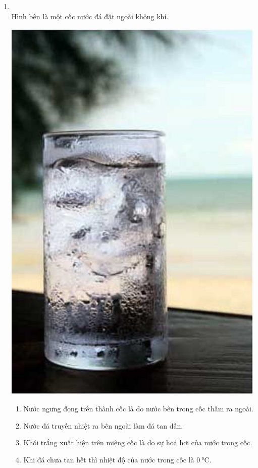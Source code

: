 \begin{enumerate}[label=\bfseries Câu \arabic*:, leftmargin=1.7cm]
	\item {}\\
	Hình bên là một cốc nước đá đặt ngoài không khí.
	\begin{center}
		\includegraphics[width=0.2\linewidth]{../figs/VN12-Y24-PH-SYL-001P-3}
	\end{center}
\begin{enumerate}[label=\alph*)]
	\item 
	Nước ngưng đọng trên thành cốc là do nước bên trong cốc thấm ra ngoài.
	\item Nước đá truyền nhiệt ra bên ngoài làm đá tan dần.
	\item Khói trắng xuất hiện trên miệng cốc là do sự hoá hơi của nước trong cốc.
	\item Khi đá chưa tan hết thì nhiệt độ của nước trong cốc là $\SI{0}{\celsius}$.
\end{enumerate}




\end{enumerate}
